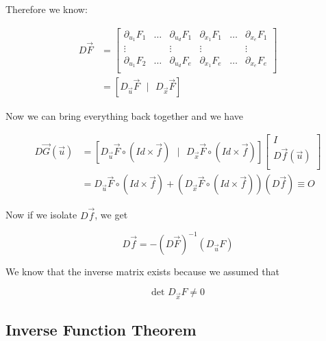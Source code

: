 \documentclass [12 pt, twoside] {book}
\newcommand\+{\text{ }}
\newcommand{\det}{\text{det }}
\begin{document}
Therefore we know:

\begin{align*}
    D\vec{F} &= \left[\begin{array}{ccc|ccc}
            \partial_{u_1} F_1 & \dots & \partial_{u_d} F_1 & \partial_{x_1}
            F_1  & \dots & \partial_{x_e} F_1\\
            \vdots & & \vdots & \vdots & & \vdots \\
            \partial_{u_1} F_2 & \dots & \partial_{u_d} F_e & \partial_{x_1} F_e
            & \dots & \partial_{x_e} F_e\\
    \end{array}\right] \\
    &= [D_{\vec{u}} \vec{F} \+|\+ D_{\vec{x}} \vec{F}]
\end{align*}

Now we can bring everything back together and we have

\begin{align*}
    D\vec{G}(\vec{u}) &= [D_{\vec{u}} \vec{F} \circ (Id \times \vec{f}) \+|\+
    D_{\vec{x}} \vec{F} \circ (Id \times \vec{f})]\left[\begin{array}{c}
                I \\
                D\vec{f} (\vec{u})\\
             \end{array}\right]\\
             &= D_{\vec{u}} \vec{F} \circ (Id \times \vec{f}) + (D_{\vec{x}}
             \vec{F} \circ (Id \times \vec{f}))(D\vec{f}) \equiv O
\end{align*}

Now if we isolate $D\vec{f}$, we get

\[
    \boxed{D\vec{f} = - (D\vec{F})^{-1} (D_{\vec{u}} F)}
\]

We know that the inverse matrix exists because we assumed that

$$\det D_{\vec{x}} F \neq 0$$

\subsection{Inverse Function Theorem}
\end{document}
